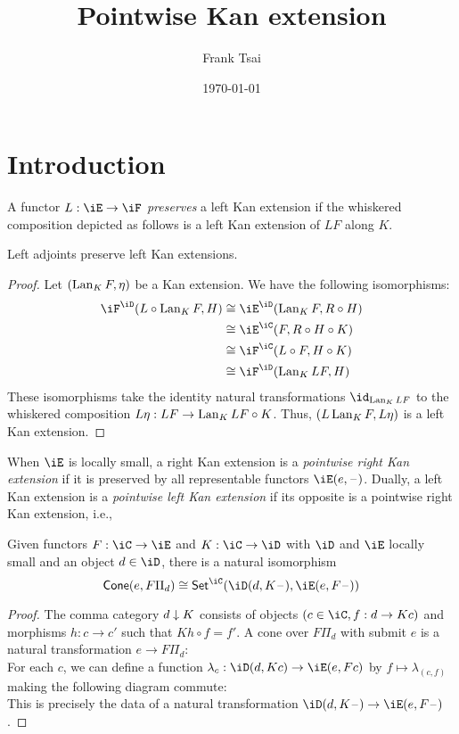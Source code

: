 \documentclass{amsart}
\title{Pointwise Kan extension}
\author{Frank Tsai}
\date{\today}
\begin{document}
\maketitle
\tableofcontents

\section{Introduction}
\label{sec:introduction}

\begin{defn}
  A functor $L : \iE \to \iF$ \emph{preserves} a left Kan extension if the whiskered composition depicted as follows is a left Kan extension of $LF$ along $K$.
  \[\]
\end{defn}

\begin{lem}
  Left adjoints preserve left Kan extensions.
\end{lem}
\begin{proof}
  Let $(\operatorname{Lan}_{K}F, \eta)$ be a Kan extension.
  We have the following isomorphisms:
  \begin{align}
    \iF^{\iD}(L \circ \lan_{K}F, H) &\iso \iE^{\iD}(\lan_{K}F, R \circ H)\\
                                &\iso \iE^{\iC}(F, R \circ H \circ K)\\
                                &\iso \iF^{\iC}(L \circ F, H \circ K)\\
                                &\iso \iF^{\iD}(\lan_{K} LF, H)
  \end{align}
  These isomorphisms take the identity natural transformations $\id_{\lan_{K}LF}$ to the whiskered composition $L\eta : LF \to \operatorname{Lan}_{K}LF \circ K$.
  Thus, $(L\operatorname{Lan}_{K}F, L\eta)$ is a left Kan extension.
\end{proof}

\begin{defn}
  When $\iE$ is locally small, a right Kan extension is a \emph{pointwise right Kan extension} if it is preserved by all representable functors $\iE(e,\blank)$.
  Dually, a left Kan extension is a \emph{pointwise left Kan extension} if its opposite is a pointwise right Kan extension, i.e.,
  \[\]
\end{defn}

\begin{lem}
  Given functors $F : \iC \to \iE$ and $K : \iC \to \iD$ with $\iD$ and $\iE$ locally small and an object $d \in \iD$, there is a natural isomorphism
  \[
    \mathsf{Cone}(e, F\Pi_{d}) \iso \mathsf{Set}^{\iC}(\iD(d,K\blank),\iE(e,F\blank))
  \]
\end{lem}
\begin{proof}
  The comma category $d \downarrow K$ consists of objects $(c \in \iC, f : d \to Kc)$ and morphisms $h : c \to c'$ such that $Kh \circ f = f'$.
  A cone over $F\Pi_{d}$ with submit $e$ is a natural transformation $e \to F\Pi_{d}$:
  \[\]
  For each $c$, we can define a function $\lambda_{c} : \iD(d,Kc) \to \iE(e,Fc)$ by $f \mapsto \lambda_{(c,f)}$ making the following diagram commute:
  \[\]
  This is precisely the data of a natural transformation $\iD(d,K\blank) \to \iE(e,F\blank)$.
\end{proof}
\end{document}
